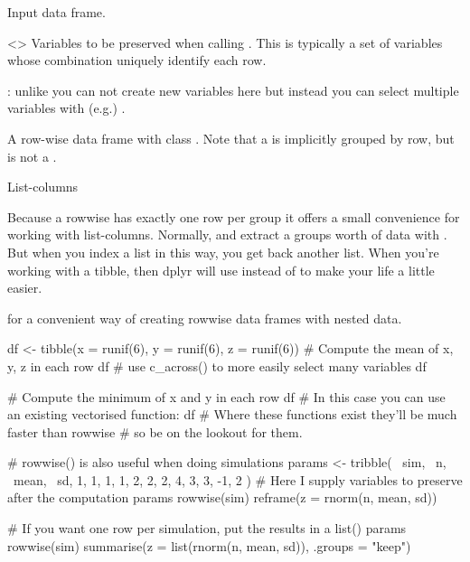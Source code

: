 \documentclass[a4paper]{book}
\begin{document}
%
\begin{Arguments}
\begin{ldescription}
\item[\code{data}] Input data frame.

\item[\code{...}] <> Variables to be preserved
when calling . This is typically a set of variables whose
combination uniquely identify each row.

: unlike  you can not create new variables here but
instead you can select multiple variables with (e.g.) .
\end{ldescription}
\end{Arguments}
%
\begin{Value}
A row-wise data frame with class . Note that a
 is implicitly grouped by row, but is not a .
\end{Value}
%
\begin{Section}{List-columns}

Because a rowwise has exactly one row per group it offers a small
convenience for working with list-columns. Normally,  and
 extract a groups worth of data with \code{[}. But when you index
a list in this way, you get back another list. When you're working with
a  tibble, then dplyr will use \code{[[} instead of \code{[} to make your
life a little easier.
\end{Section}
%
\begin{SeeAlso}
 for a convenient way of creating rowwise data frames
with nested data.
\end{SeeAlso}
%
\begin{Examples}
\begin{ExampleCode}
df <- tibble(x = runif(6), y = runif(6), z = runif(6))
# Compute the mean of x, y, z in each row
df %
# use c_across() to more easily select many variables
df %

# Compute the minimum of x and y in each row
df %
# In this case you can use an existing vectorised function:
df %
# Where these functions exist they'll be much faster than rowwise
# so be on the lookout for them.

# rowwise() is also useful when doing simulations
params <- tribble(
 ~sim, ~n, ~mean, ~sd,
    1,  1,     1,   1,
    2,  2,     2,   4,
    3,  3,    -1,   2
)
# Here I supply variables to preserve after the computation
params %
  rowwise(sim) %
  reframe(z = rnorm(n, mean, sd))

# If you want one row per simulation, put the results in a list()
params %
  rowwise(sim) %
  summarise(z = list(rnorm(n, mean, sd)), .groups = "keep")
\end{ExampleCode}
\end{Examples}
\end{document}
